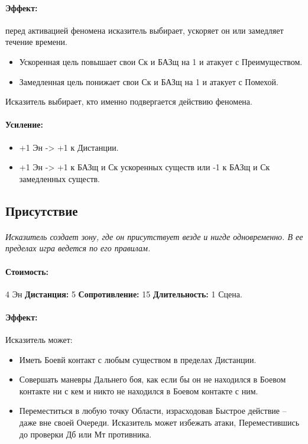 \begin{itemize}
\begin{itemize}
\paragraph{Эффект: }перед активацией феномена исказитель выбирает, ускоряет он или замедляет течение времени. 
\begin{itemize} 
\item Ускоренная цель повышает свои Ск и БАЗщ на 1 и атакует с Преимуществом. 
\item Замедленная цель понижает свои Ск и БАЗщ на 1 и атакует с Помехой. 
\end{itemize} Исказитель выбирает, кто именно подвергается действию феномена.
\paragraph{Усиление:}
\begin{itemize}
\item+1 Эн -> +1 к Дистанции.
\item+1 Эн -> +1 к БАЗщ и Ск ускоренных существ или -1 к БАЗщ и Ск замедленных существ.
\end{itemize}
\subsection{Присутствие}
\paragraph{} 
\textit{Исказитель создает зону, где он присутствует везде и нигде одновременно. В ее пределах игра ведется по его правилам.}
\paragraph{Стоимость: }4 Эн
\newline
\textbf{Дистанция: }5
\newline
\textbf{Сопротивление: }15
\newline 
\textbf{Длительность: }1 Сцена.
\paragraph{Эффект: }Исказитель может: 
\begin{itemize} 
\item Иметь Боевй контакт с любым существом в пределах Дистанции. 
\item Совершать маневры Дальнего боя, как если бы он не находился в Боевом контакте ни с кем и никто не находился в Боевом контакте с ним. 
\item Переместиться в любую точку Области, израсходовав Быстрое действие – даже вне своей Очереди. Исказитель может избежать атаки, Переместившись до проверки Дб или Мт противника. 
\end{itemize}

\end{itemize}
\end{itemize}
